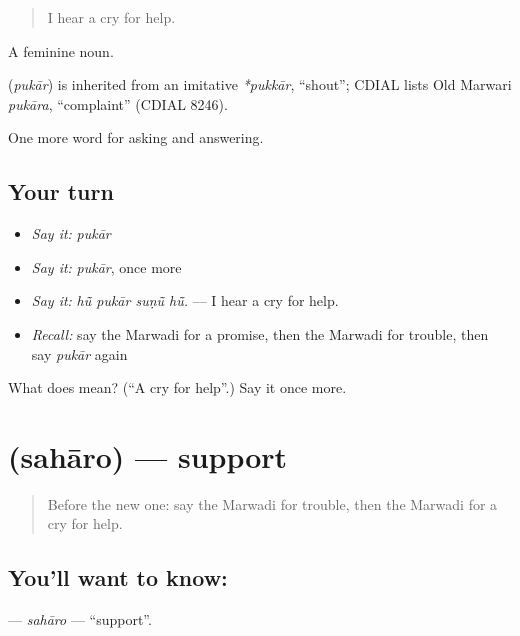 \begin{quote}
I hear a cry for help.
\end{quote}

A feminine noun.

\begin{cousinweb}
\textbf{} (\emph{pukār}) is inherited from an imitative \emph{*pukkār}, \textquotedblleft{}shout\textquotedblright{}; CDIAL lists Old Marwari \emph{pukāra}, \textquotedblleft{}complaint\textquotedblright{} (CDIAL 8246).
\end{cousinweb}

\begin{grammarlens}[title={What you've built}]
One more word for asking and answering.
\end{grammarlens}

\subsection*{Your turn}
\begin{itemize}
\raggedright
  \item \emph{Say it:} \emph{pukār}
  \item \emph{Say it:} \emph{pukār}, once more
  \item \emph{Say it:} \emph{hū̃ pukār suṇū̃ hū̃.} — I hear a cry for help.
  \item \emph{Recall:} say the Marwadi for a promise, then the Marwadi for trouble, then say \emph{pukār} again
\end{itemize}

\begin{tcolorbox}[breakable,colback=teal!4,colframe=teal!35!black,title={Before you move on}]
What does  mean? (\textquotedblleft{}A cry for help\textquotedblright{}.) Say it once more.
\end{tcolorbox}
\section[\texorpdfstring{\mw{सहारो} (sahāro)}{सहारो (sahāro)}]{ (sahāro) — support}

\label{lesson:MW-C274-saharo}



\begin{quote}
Before the new one: say the Marwadi for trouble, then the Marwadi for a cry for help.
\end{quote}

\subsection*{You'll want to know: }
\textbf{} — \emph{sahāro} — \textquotedblleft{}support\textquotedblright{}.

